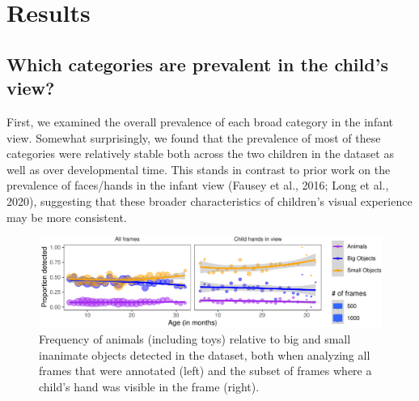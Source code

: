 \documentclass[10pt, letterpaper]{article}
\newenvironment{CodeChunk}{}{}
\begin{document}
\hypertarget{results}{%
\section{Results}\label{results}}

\hypertarget{which-categories-are-prevalent-in-the-childs-view}{%
\subsection{Which categories are prevalent in the child's
view?}\label{which-categories-are-prevalent-in-the-childs-view}}

First, we examined the overall prevalence of each broad category in the
infant view. Somewhat surprisingly, we found that the prevalence of most
of these categories were relatively stable both across the two children
in the dataset as well as over developmental time. This stands in
contrast to prior work on the prevalence of faces/hands in the infant
view (Fausey et al., 2016; Long et al., 2020), suggesting that these
broader characteristics of children's visual experience may be more
consistent.

\begin{CodeChunk}
\begin{figure}[h]

{\centering \includegraphics{figs/anim_size-1} 

}

\caption[Frequency of animals (including toys) relative to big and small inanimate objects detected in the dataset, both when analyzing all frames that were annotated (left) and the subset of frames where a child's hand was visible in the frame (right)]{Frequency of animals (including toys) relative to big and small inanimate objects detected in the dataset, both when analyzing all frames that were annotated (left) and the subset of frames where a child's hand was visible in the frame (right).}\label{fig:anim_size}
\end{figure}
\end{CodeChunk}
\end{document}
